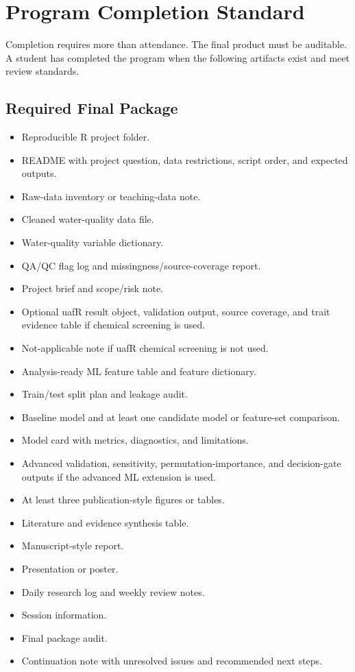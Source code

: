 \chapter{Program Completion Standard}

Completion requires more than attendance. The final product must be auditable. A student has completed the program when the following artifacts exist and meet review standards.

\section{Required Final Package}

\begin{itemize}
  \item Reproducible R project folder.
  \item README with project question, data restrictions, script order, and expected outputs.
  \item Raw-data inventory or teaching-data note.
  \item Cleaned water-quality data file.
  \item Water-quality variable dictionary.
  \item QA/QC flag log and missingness/source-coverage report.
  \item Project brief and scope/risk note.
  \item Optional uafR result object, validation output, source coverage, and trait evidence table if chemical screening is used.
  \item Not-applicable note if uafR chemical screening is not used.
  \item Analysis-ready ML feature table and feature dictionary.
  \item Train/test split plan and leakage audit.
  \item Baseline model and at least one candidate model or feature-set comparison.
  \item Model card with metrics, diagnostics, and limitations.
  \item Advanced validation, sensitivity, permutation-importance, and decision-gate outputs if the advanced ML extension is used.
  \item At least three publication-style figures or tables.
  \item Literature and evidence synthesis table.
  \item Manuscript-style report.
  \item Presentation or poster.
  \item Daily research log and weekly review notes.
  \item Session information.
  \item Final package audit.
  \item Continuation note with unresolved issues and recommended next steps.
\end{itemize}

